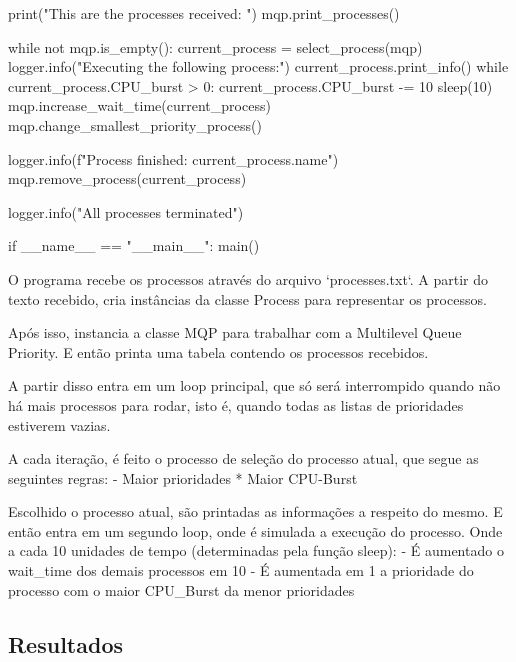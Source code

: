\begin{pycode}
        print("This are the processes received: ")
        mqp.print_processes()

        while not mqp.is_empty():
            current_process = select_process(mqp)
            logger.info("Executing the following process:")
            current_process.print_info()        
            while current_process.CPU_burst > 0:
                current_process.CPU_burst -= 10
                sleep(10)
                mqp.increase_wait_time(current_process)
                mqp.change_smallest_priority_process()

            logger.info(f"Process finished: {current_process.name}\n")
            mqp.remove_process(current_process)
        
        logger.info("All processes terminated")

    if __name__ == "__main__":
        main()
\end{pycode}

O programa recebe os processos através do arquivo `processes.txt`. A partir do texto recebido, cria instâncias da classe Process para representar os processos.

Após isso, instancia a classe MQP para trabalhar com a Multilevel Queue Priority. E então printa uma tabela contendo os processos recebidos.

A partir disso entra em um loop principal, que só será interrompido quando não há mais processos para rodar, isto é, quando todas as listas de prioridades estiverem vazias.

A cada iteração, é feito o processo de seleção do processo atual, que segue as seguintes regras:
- Maior prioridades
* Maior CPU-Burst

Escolhido o processo atual, são printadas as informações a respeito do mesmo. E então entra em um segundo loop, onde é simulada a execução do processo. Onde a cada 10 unidades de tempo (determinadas pela função sleep):
- É aumentado o wait_time dos demais processos em 10
- É aumentada em 1 a prioridade do processo com o maior CPU_Burst da menor prioridades

\subsection*{Resultados}

